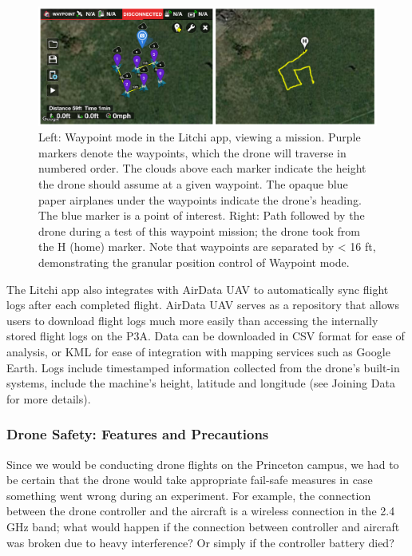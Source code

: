 \documentclass[pageno]{jpaper}
\begin{document}
\begin{figure}[h]
	\caption{Left: Waypoint mode in the Litchi app, viewing a mission. Purple markers denote the waypoints, which the drone will traverse in numbered order. The clouds above each marker indicate the height the drone should assume at a given waypoint. The opaque blue paper airplanes under the waypoints indicate the drone's heading. The blue marker is a point of interest. Right: Path followed by the drone during a test of this waypoint mission; the drone took from the H (home) marker. Note that waypoints are separated by < 16 ft, demonstrating the granular position control of Waypoint mode.}
	\includegraphics{waypoint}
	\centering
\end{figure}

The Litchi app also integrates with AirData UAV to automatically sync flight logs after each completed flight. AirData UAV serves as a repository that allows users to download flight logs much more easily than accessing the internally stored flight logs on the P3A. Data can be downloaded in CSV format for ease of analysis, or KML for ease of integration with mapping services such as Google Earth.  Logs include timestamped information collected from the drone's built-in systems, include the machine's height, latitude and longitude (see Joining Data for more details).

\subsubsection{Drone Safety: Features and Precautions}
Since we would be conducting drone flights on the Princeton campus, we had to be certain that the drone would take appropriate fail-safe measures in case something went wrong during an experiment. For example, the connection between the drone controller and the aircraft is a wireless connection in the 2.4 GHz band; what would happen if the connection between controller and aircraft was broken due to heavy interference? Or simply if the controller battery died?
\end{document}
